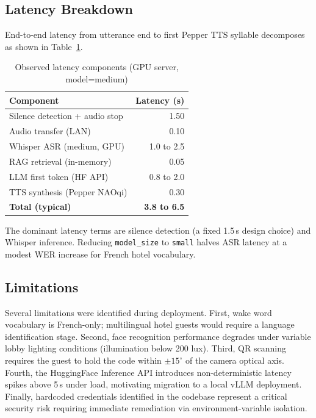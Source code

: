 \documentclass[a4paper]{article}
\begin{document}
\subsection{Latency Breakdown}

End-to-end latency from utterance end to first Pepper TTS syllable decomposes as shown in Table~\ref{tab:latency}.

\begin{table}[th]
  \caption{Observed latency components (GPU server, model=medium)}
  \label{tab:latency}
  \centering
  \begin{tabular}{lr}
    \toprule
    \textbf{Component} & \textbf{Latency (s)} \\
    \midrule
    Silence detection + audio stop & 1.50 \\
    Audio transfer (LAN)           & 0.10 \\
    Whisper ASR (medium, GPU)      & 1.0 to 2.5 \\
    RAG retrieval (in-memory)      & 0.05 \\
    LLM first token (HF API)       & 0.8 to 2.0 \\
    TTS synthesis (Pepper NAOqi)   & 0.30 \\
    \midrule
    \textbf{Total (typical)}       & \textbf{3.8 to 6.5} \\
    \bottomrule
  \end{tabular}
\end{table}

The dominant latency terms are silence detection (a fixed 1.5\,s design choice) and Whisper inference. Reducing \texttt{model\_size} to \texttt{small} halves ASR latency at a modest WER increase for French hotel vocabulary.

\subsection{Limitations}

Several limitations were identified during deployment. First, wake word vocabulary is French-only; multilingual hotel guests would require a language identification stage. Second, face recognition performance degrades under variable lobby lighting conditions (illumination below 200 lux). Third, QR scanning requires the guest to hold the code within $\pm 15^{\circ}$ of the camera optical axis. Fourth, the HuggingFace Inference API introduces non-deterministic latency spikes above 5\,s under load, motivating migration to a local vLLM deployment. Finally, hardcoded credentials identified in the codebase represent a critical security risk requiring immediate remediation via environment-variable isolation.
\end{document}

